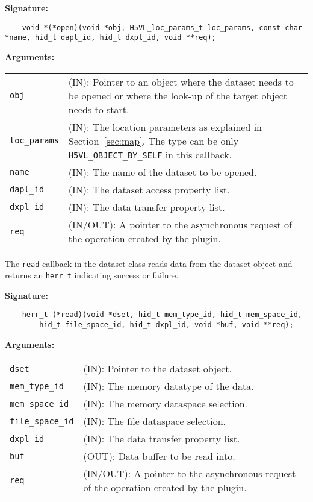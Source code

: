 \begin{mdframed}[style=bgbox]
\textbf{Signature:}
\begin{lstlisting}
    void *(*open)(void *obj, H5VL_loc_params_t loc_params, const char *name, hid_t dapl_id, hid_t dxpl_id, void **req);
\end{lstlisting}

\textbf{Arguments:}\\
\begin{tabular}{l p{13.5cm}}
  \texttt{obj} & (IN): Pointer to an object where the dataset needs to be
  opened or where the look-up of the target object needs to start.\\
  \texttt{loc\_params} & (IN): The location parameters as explained in
  Section~\ref{sec:map}. The type can be only \texttt{H5VL\_OBJECT\_BY\_SELF} in this callback. \\
  \texttt{name} & (IN): The name of the dataset to be opened.\\
  \texttt{dapl\_id} & (IN): The dataset access property list.\\
  \texttt{dxpl\_id} & (IN): The data transfer property list.\\
  \texttt{req} & (IN/OUT): A pointer to the asynchronous request of the
  operation created by the plugin.\\
\end{tabular}
\end{mdframed}

The \texttt{read} callback in the dataset class  reads data from
the dataset object and returns an \texttt{herr\_t} indicating success or
failure.\bigskip

\begin{mdframed}[style=bgbox]
\textbf{Signature:}
\begin{lstlisting}
    herr_t (*read)(void *dset, hid_t mem_type_id, hid_t mem_space_id, 
        hid_t file_space_id, hid_t dxpl_id, void *buf, void **req);
\end{lstlisting}

\textbf{Arguments:}\\
\begin{tabular}{l p{13.5cm}}
  \texttt{dset} & (IN): Pointer to the dataset object.\\
  \texttt{mem\_type\_id} & (IN): The memory datatype of the data.\\
  \texttt{mem\_space\_id} & (IN): The memory dataspace selection.\\
  \texttt{file\_space\_id} & (IN): The file dataspace selection.\\
  \texttt{dxpl\_id} & (IN): The data transfer property list.\\
  \texttt{buf} & (OUT): Data buffer to be read into.\\
  \texttt{req} & (IN/OUT): A pointer to the asynchronous request of the
  operation created by the plugin.\\
\end{tabular}
\end{mdframed}

